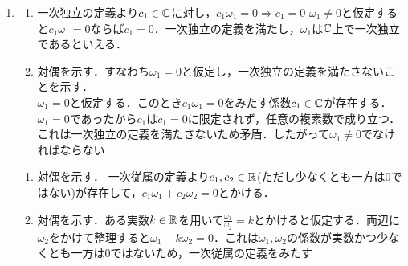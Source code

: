 \documentclass[dvipdfmx]{jsreport}
\begin{document}
\begin{souanswer}
\begin{enumerate}
	\item 
\begin{enumerate}
	\item[$\Rightarrow)$] 一次独立の定義より$c_1\in \mathbb{C}$に対し，$c_1\omega_1= 0\Rightarrow c_1= 0$
	$\omega_1\ne 0$と仮定すると$c_1\omega_1= 0$ならば$c_1= 0$．一次独立の定義を満たし，$\omega_1$は$\mathbb{C}$上で一次独立であるといえる．
	\item [$\Leftarrow)$] 対偶を示す．すなわち$\omega_1= 0$と仮定し，一次独立の定義を満たさないことを示す．\\
	$\omega_1= 0$と仮定する．このとき$c_1\omega_1= 0$をみたす係数$c_1\in \mathbb{C}$が存在する．$\omega_1= 0$であったから$c_1$は$c_1= 0$に限定されず，任意の複素数で成り立つ．これは一次独立の定義を満たさないため矛盾．したがって$\omega_1\ne 0$でなければならない
\end{enumerate}
\begin{enumerate}

	\item[$\Rightarrow)$] 対偶を示す．
	一次従属の定義より$c_1, c_2\in \mathbb{R}$(ただし少なくとも一方は0ではない)が存在して，$c_1\omega_1+ c_2\omega_2= 0$とかける．
	\item[$\Leftarrow)$] 対偶を示す．ある実数$k\in \mathbb{R}$を用いて$\frac{\omega_1}{\omega_2}= k$とかけると仮定する．両辺に$\omega_2$をかけて整理すると$\omega_1- k\omega_2= 0$．これは$\omega_1, \omega_2$の係数が実数かつ少なくとも一方は0ではないため，一次従属の定義をみたす
\end{enumerate}
\end{enumerate} 
\end{souanswer}
\end{document}
